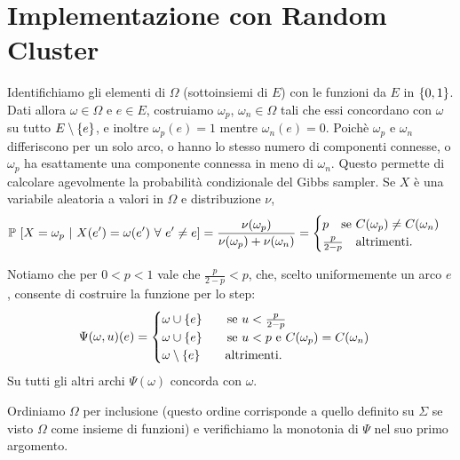 \documentclass[]{marticle}
\begin{document}
\section{Implementazione con Random Cluster}

Identifichiamo gli elementi di $\Omega$ (sottoinsiemi di $E$) con le funzioni da
$E$ in  $\{0,1\}$. Dati allora $\omega\in\Omega$ e $e\in E$, costruiamo
$\omega_p$, $\omega_n\in\Omega$ tali che essi concordano con $\omega$ su tutto
$E \setminus \{e\}$, e inoltre $\omega_p(e) = 1$ mentre $\omega_n(e)=0$. 
Poich\`e $\omega_p$ e $\omega_n$ differiscono per un solo arco, o hanno lo
stesso numero di componenti connesse, o $\omega_p$ ha esattamente una componente
connessa in meno di $\omega_n$. Questo permette di calcolare agevolmente la
probabilit\`a condizionale del Gibbs sampler. Se $X$ \`e una variabile aleatoria
a valori in $\Omega$ e distribuzione $\nu$,
\[
    \prob{X=\omega_p \ |\ X(e')=\omega(e') \ \forall e' \neq e} = 
    \frac{\nu(\omega_p)}{\nu(\omega_p)+\nu(\omega_n)} = 
    \begin{cases}
        p \text{\quad se $C(\omega_p) \neq C(\omega_n)$}\\
        \frac{p}{2-p} \text{\quad altrimenti}.
    \end{cases}
\]

Notiamo che per $0<p<1$ vale che $\frac{p}{2-p}<p$, che, scelto uniformemente un
arco $e$, consente di costruire la funzione per lo step:
\[
    \Psi(\omega,u)(e) =
    \begin{cases}
        \omega \cup \{e\} \text{\qquad se $u<\frac{p}{2-p}$}\\
        \omega \cup \{e\} \text{\qquad se $u<p$ e $C(\omega_p) =
            C(\omega_n)$}\\
        \omega \setminus \{e\} \text{\qquad altrimenti.} 

    \end{cases}
\]
Su tutti gli altri archi $\Psi(\omega)$ concorda con $\omega$.

Ordiniamo $\Omega$ per inclusione (questo ordine corrisponde a quello definito
su $\Sigma$ se visto $\Omega$ come insieme di funzioni) e verifichiamo la
monotonia di $\Psi$ nel suo primo argomento.
\end{document}
